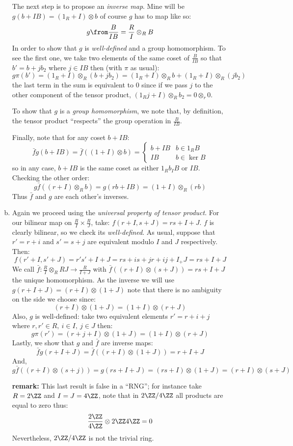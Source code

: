 \begin{description}
\begin{enumerate}[(a)]
            The next step is to propose an \emph{inverse map}. Mine will be $g(b+IB) = (1_R+I)\otimes b$ of course $g$ has to map like so:
            $$g\from \frac B{IB} = \frac RI\otimes_R B$$
            In order to show that $g$ is \emph{well-defined} and a group homomorphism. To see the first one, we take two elements of the same coset of $\frac B{IB}$ so that $b'=b+jb_2$ where $j\in IB$ then (with $\pi$ as usual):
            $$g\pi(b') = (1_R+I)\otimes_R (b+jb_2) = (1_R+I)\otimes_R b +(1_R+I)\otimes_R(jb_2)$$
            the last term in the sum is equivalent to 0 since if we pass $j$ to the other component of the tensor product, $(1_Rj+I)\otimes_R b_2=0\otimes_r 0$.

            To show that $g$ is a \emph{group homomorphism}, we note that, by definition, the tensor product ``respects'' the group operation in $\frac B{IB}$.

            Finally, note that for any coset $b+IB$:
            $$\bar f g(b+IB)=\bar f((1+I)\otimes b)=\begin{cases}
                b+IB & b\in 1_RB\\ 
                IB & b \in \ker B
            \end{cases}$$
            so in any case, $b+IB$ is the same coset as either $1_Rb_IB$ or $IB$. Checking the other order:
            $$g\bar f((r+I)\otimes_R b) = g(rb+IB)=(1+I)\otimes_R(rb)$$
            Thus $\bar f$ and $g$ are each other's inverses. 
        \item Again we proceed using the \emph{universal property of tensor product}. For our bilinear map on $\frac RI\times \frac RJ$, take: $f(r+I,s+J)=rs+I+J$. $f$ is clearly bilinear, so we check its \emph{well-defined}. As usual, suppose that $r'=r+i$ and $s'=s+j$ are equivalent modulo $I$ and $J$ respectively. Then:
            $$f(r'+I,s'+J)= r's'+I+J=rs+is+jr +ij+I_+J= rs+I+J$$
            We call $\bar f: \frac RI \otimes_R RJ \to \frac R{I+J}$ with $\bar f((r+I) \otimes (s+J))=rs+I+J$ the unique homomorphism. As the inverse we will use $g(r+I+J) = (r+I)\otimes (1+J)$ note that there is no ambiguity on the side we choose since:
            $$(r+I)\otimes (1+J) = (1+I)\otimes(r+J)$$
            Also, $g$ is well-defined: take two equivalent elements $r' = r+i+j$ where $r,r'\in R,\ i\in I,\ j\in J$ then:
            $$g\pi(r')=(r+j+I)\otimes (1+J)=(1+I)\otimes (r+J)$$
            Lastly, we show that $g$ and $\bar f$ are inverse maps:
            $$\bar fg(r+I+J) = \bar f((r+I)\otimes(1+J))=r+I+J$$
            And,
            $$g\bar f((r+I)\otimes (s+j))= g(rs+I+J)=(rs+I)\otimes(1+J) = (r+I)\otimes(s+J)$$

            \textbf{remark:} This last result is false in a ``RNG''; for instance take $R=2\ZZ$ and $I=J=4\ZZ$, note that in $2\ZZ/4\ZZ$ all products are equal to zero thus:
            $$\frac {2\ZZ}{4\ZZ}\otimes {2\ZZ}{4\ZZ} = 0$$
            Nevertheless, $2\ZZ/4\ZZ$ is not the trivial ring.
    \end{enumerate}
\end{description}
